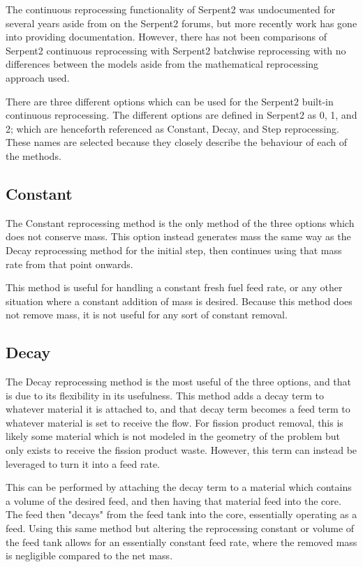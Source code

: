 The continuous reprocessing functionality of Serpent2 was undocumented for several years aside from on the Serpent2 forums, but more recently work has gone into providing documentation. However, there has not been comparisons of Serpent2 continuous reprocessing with Serpent2 batchwise reprocessing with no differences between the models aside from the mathematical reprocessing approach used.

There are three different options which can be used for the Serpent2 built-in continuous reprocessing. The different options are defined in Serpent2 as 0, 1, and 2; which are henceforth referenced as Constant, Decay, and Step reprocessing. These names are selected because they closely describe the behaviour of each of the methods.

\subsection{Constant}
The Constant reprocessing method is the only method of the three options which does not conserve mass. This option instead generates mass the same way as the Decay reprocessing method for the initial step, then continues using that mass rate from that point onwards.

This method is useful for handling a constant fresh fuel feed rate, or any other situation where a constant addition of mass is desired. Because this method does not remove mass, it is not useful for any sort of constant removal.

\subsection{Decay}
The Decay reprocessing method is the most useful of the three options, and that is due to its flexibility in its usefulness. This method adds a decay term to whatever material it is attached to, and that decay term becomes a feed term to whatever material is set to receive the flow. For fission product removal, this is likely some material which is not modeled in the geometry of the problem but only exists to receive the fission product waste. However, this term can instead be leveraged to turn it into a feed rate.

This can be performed by attaching the decay term to a material which contains a volume of the desired feed, and then having that material feed into the core. The feed then "decays" from the feed tank into the core, essentially operating as a feed. Using this same method but altering the reprocessing constant or volume of the feed tank allows for an essentially constant feed rate, where the removed mass is negligible compared to the net mass.

